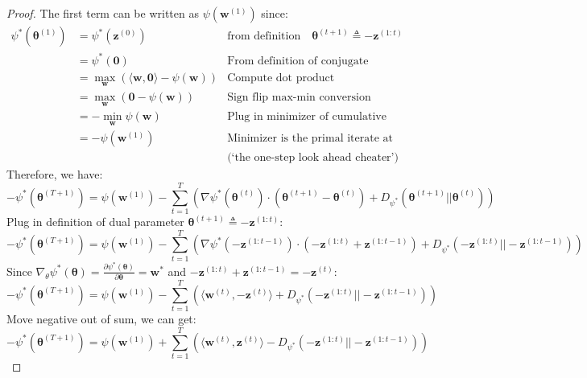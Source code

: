 \documentclass[11pt]{article}
\begin{document}
\begin{proof}
The first term can be written as $\psi(\bm{w}^{(1)})$ since:
\begin{align*}
    \psi^*(\bm{\theta}^{(1)}) &= \psi^*(\bm{\bm{z}}^{(0)})
    & \text{from definition} \quad \bm{\theta}^{(t+1)} \triangleq - \bm{z}^{(1:t)} \\
    &= \psi^*(\bm{0})
    & \text{From definition of conjugate}\\
    &= \max_{\bm{w}} (\langle \bm{w}, \bm{0} \rangle
    - \psi(\bm{w}))
    & \text{Compute dot product}\\
    &= \max_{\bm{w}} (\bm{0} 
    - \psi(\bm{w}))
    & \text{Sign flip max-min conversion}\\
        &= -\min_{\bm{w}}
    \psi(\bm{w})
    & \text{Plug in minimizer of cumulative loss at time 1}\\
    &= -
    \psi(\bm{w}^{(1)})
    & \text{Minimizer is the primal iterate at step 1}\\
    & &\text{(`the one-step look ahead cheater')}
\end{align*}
Therefore, we have:
\begin{equation*}
    -\psi^*(\bm{\theta}^{(T+1)}) = \psi(\bm{w}^{(1)}) - \sum_{t=1}^T \left( \nabla \psi^*(\bm{\theta}^{(t)}) \cdot (\bm{\theta}^{(t+1)} - \bm{\theta}^{(t)}) +  D_{\psi^*}(\bm{\theta}^{(t+1)}||\bm{\theta}^{(t)})\right)
\end{equation*}
Plug in definition of dual parameter $\bm{\theta}^{(t+1)} \triangleq - \bm{z}^{(1:t)}$:
\begin{equation*}
    -\psi^*(\bm{\theta}^{(T+1)}) = \psi(\bm{w}^{(1)}) - \sum_{t=1}^T \left( \nabla \psi^*(-\bm{z}^{(1:t-1)}) \cdot (-\bm{z}^{(1:t)} + \bm{z}^{(1:t-1)}) +  D_{\psi^*}(-\bm{z}^{(1:t)}||-\bm{z}^{(1:t-1)})\right)
\end{equation*}
Since $\nabla_{\theta} \psi^*(\bm{\theta}) = \frac{\partial \psi^*(\bm{\theta})}{\partial \bm{\theta}} = \bm{w}^* $ and $-\bm{z}^{(1:t)} + \bm{z}^{(1:t-1)} = -\bm{z}^{(t)}$:
\begin{equation*}
    -\psi^*(\bm{\theta}^{(T+1)}) = \psi(\bm{w}^{(1)}) - \sum_{t=1}^T \left( \langle \bm{w}^{(t)}, -\bm{z}^{(t)} \rangle +  D_{\psi^*}(-\bm{z}^{(1:t)}||-\bm{z}^{(1:t-1)})\right)
\end{equation*}
Move negative out of sum, we can get:
\begin{equation*}
    -\psi^*(\bm{\theta}^{(T+1)}) = \psi(\bm{w}^{(1)}) + \sum_{t=1}^T \left( \langle \bm{w}^{(t)}, \bm{z}^{(t)} \rangle -  D_{\psi^*}(-\bm{z}^{(1:t)}||-\bm{z}^{(1:t-1)})\right)
\end{equation*}

\end{proof}
\end{document}

